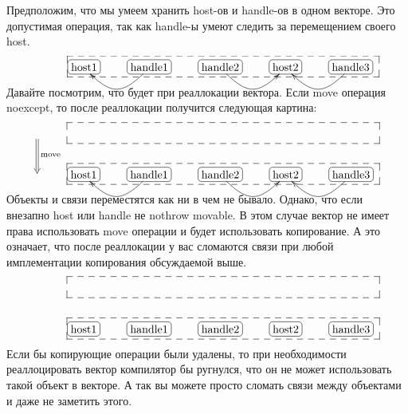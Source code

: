 Предположим, что мы умеем хранить host-ов и handle-ов в одном векторе.
Это допустимая операция, так как handle-ы умеют следить за перемещением своего host.
\[
\xymatrix{
  {}&{\text{host1}}
  {
	\save
   [].[rrrr]*+[F--]\frm{}
   \restore
	}
  {
	\save
   [].[]*[F-:<3pt>]\frm{}
   \restore
	}
  &{\text{handle1}}\ar@(dl,dr)[l]
  {\save
   [].[]*[F-:<3pt>]\frm{}
   \restore
	}
  &{\text{handle2}}\ar@(dr,dl)[r]
  {\save
   [].[]*[F-:<3pt>]\frm{}
   \restore
	}
  &{\text{host2}}
  	{\save
   [].[]*[F-:<3pt>]\frm{}
   \restore
	}
  &{\text{handle3}}\ar@(dl,dr)[l]
  {\save
   [].[]*[F-:<3pt>]\frm{}
   \restore
	}
  \\
}
\]
Давайте посмотрим, что будет при реаллокации вектора.
Если move операция noexcept, то после реаллокации получится следующая картина:
\[
\xymatrix{
     {}\ar@{=>}[d]^{\text{move}}&{\phantom{\text{host1}}}
  {
	\save
   [].[rrrr]*+[F--]\frm{}
   \restore
	}
  {
	\save
   [].[]*\frm{}
   \restore
	}
  &{\phantom{\text{handle1}}}
  {\save
   [].[]*\frm{}
   \restore
	}
  &{\phantom{\text{handle2}}}
  {\save
   [].[]*\frm{}
   \restore
	}
  &{\phantom{\text{host2}}}
  	{\save
   [].[]*\frm{}
   \restore
	}
  &{\phantom{\text{handle3}}}
  {\save
   [].[]*\frm{}
   \restore
	}\\
  {}&{\text{host1}}
  {
	\save
   [].[rrrr]*+[F--]\frm{}
   \restore
	}
  {
	\save
   [].[]*[F-:<3pt>]\frm{}
   \restore
	}
  &{\text{handle1}}\ar@(dl,dr)[l]
  {\save
   [].[]*[F-:<3pt>]\frm{}
   \restore
	}
  &{\text{handle2}}\ar@(dr,dl)[r]
  {\save
   [].[]*[F-:<3pt>]\frm{}
   \restore
	}
  &{\text{host2}}
  	{\save
   [].[]*[F-:<3pt>]\frm{}
   \restore
	}
  &{\text{handle3}}\ar@(dl,dr)[l]
  {\save
   [].[]*[F-:<3pt>]\frm{}
   \restore
	}
  \\
}
\]
Объекты и связи переместятся как ни в чем не бывало.
Однако, что если внезапно host или handle не nothrow movable.
В этом случае вектор не имеет права использовать move операции и будет использовать копирование.
А это означает, что после реаллокации у вас сломаются связи при любой имплементации копирования обсуждаемой выше.
\[
\xymatrix{
  {}&{\phantom{\text{host1}}}
  {
	\save
   [].[rrrr]*+[F--]\frm{}
   \restore
	}
  {
	\save
   [].[]*\frm{}
   \restore
	}
  &{\phantom{\text{handle1}}}
  {\save
   [].[]*\frm{}
   \restore
	}
  &{\phantom{\text{handle2}}}
  {\save
   [].[]*\frm{}
   \restore
	}
  &{\phantom{\text{host2}}}
  	{\save
   [].[]*\frm{}
   \restore
	}
  &{\phantom{\text{handle3}}}
  {\save
   [].[]*\frm{}
   \restore
	}
  \\
   {}&{\text{host1}}
  {
	\save
   [].[rrrr]*+[F--]\frm{}
   \restore
	}
  {
	\save
   [].[]*[F-:<3pt>]\frm{}
   \restore
	}
  &{\text{handle1}}
  {\save
   [].[]*[F-:<3pt>]\frm{}
   \restore
	}
  &{\text{handle2}}
  {\save
   [].[]*[F-:<3pt>]\frm{}
   \restore
	}
  &{\text{host2}}
  	{\save
   [].[]*[F-:<3pt>]\frm{}
   \restore
	}
  &{\text{handle3}}
  {\save
   [].[]*[F-:<3pt>]\frm{}
   \restore
	}
}
\]
Если бы копирующие операции были удалены, то при необходимости реаллоцировать вектор компилятор бы ругнулся, что он не может использовать такой объект в векторе.
А так вы можете просто сломать связи между объектами и даже не заметить этого.

